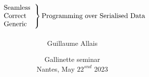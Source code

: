 \documentclass{beamer}
\title{
  \[
  \left.
    \begin{tabular}{l}
      Seamless \\
      Correct \\
      Generic
    \end{tabular}
  \right\}
  \text{Programming over Serialised Data}
  \]}
\author{Guillaume Allais}
\institute{University of Strathclyde \\ Glasgow, UK}
\date{Gallinette seminar \\ Nantes, May $22^{snd}$ 2023}
\begin{document}
\begin{frame}
  \maketitle
\end{frame}







\end{document}
